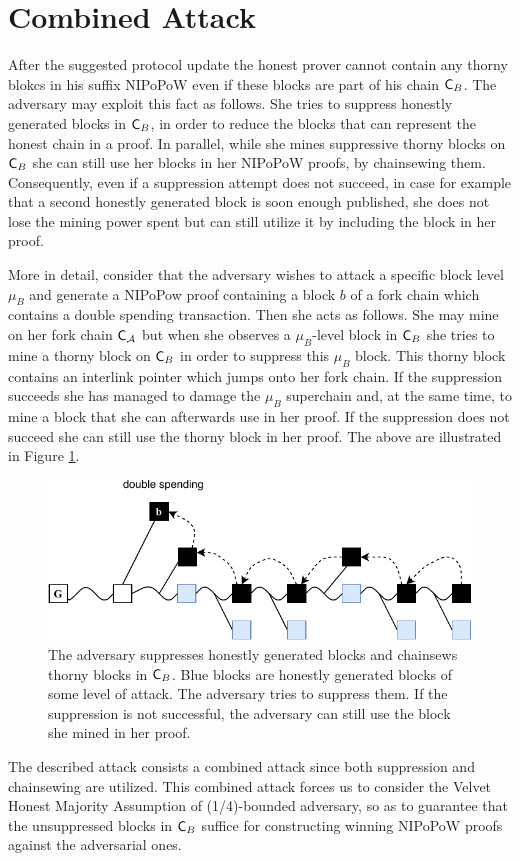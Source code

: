 \section{Combined Attack}
After the suggested protocol update the honest prover cannot contain any thorny blokcs in his suffix NIPoPoW even if these blocks are part of his chain $\mathsf{C}_B$. The adversary may exploit this fact as follows. She tries to suppress honestly generated blocks in $\mathsf{C}_B$, in order to reduce the blocks that can represent the honest chain in a proof. In parallel, while she mines suppressive thorny blocks on $\mathsf{C}_B$ she can still use her blocks in her NIPoPoW proofs, by chainsewing them. Consequently, even if a suppression attempt does not succeed, in case for example that a second honestly generated block is soon enough published, she does not lose the mining power spent but can still utilize it by including the block in her proof.

More in detail, consider that the adversary wishes to attack a specific block level $\mu_B$ and generate a NIPoPow proof containing a block $b$ of a fork chain which contains a double spending transaction. Then she acts as follows. She may mine on her fork chain $\mathsf{C}_\mathcal{A}$ but when she observes a $\mu_B$-level block in $\mathsf{C}_B$ she tries to mine a thorny block on $\mathsf{C}_B$ in order to suppress this $\mu_B$ block. This thorny block contains an interlink pointer which jumps onto her fork chain. If the suppression succeeds she has managed to damage the $\mu_B$ superchain and, at the same time, to mine a block that she can afterwards use in her proof. If the suppression does not succeed she can still use the thorny block in her proof. The above are illustrated in Figure \ref{fig:attack_after_update}.

\begin{figure}[h!]
	\begin{center}
    \includegraphics[width=0.95\columnwidth]{figures/attack_after_update-crop.pdf}
	\end{center}
	\caption{The adversary suppresses honestly generated blocks and chainsews thorny blocks in $\mathsf{C}_B$. Blue blocks are honestly generated blocks of some level of attack. The adversary tries to suppress them. If the suppression is not successful, the adversary can still use the block she mined in her proof.}
	\label{fig:attack_after_update}
\end{figure}

The described attack consists a combined attack since both suppression and chainsewing are utilized. This combined attack forces us to consider the Velvet Honest Majority Assumption of (1/4)-bounded adversary, so as to guarantee that the unsuppressed blocks in $\mathsf{C}_B$ suffice for constructing winning NIPoPoW proofs against the adversarial ones.
